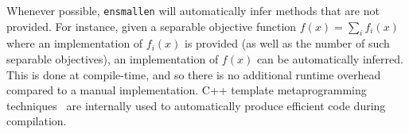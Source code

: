 \documentclass[twoside,11pt]{article}
\begin{document}
Whenever possible, {\tt ensmallen} will automatically infer methods that are
not provided.  For instance, given a separable objective function $f(x) = \sum_i
f_i(x)$ where an implementation of $f_i(x)$ is provided (as well as the number
of such separable objectives), an implementation of $f(x)$ can be automatically
inferred.  This is done at compile-time, and so there is no additional runtime
overhead compared to a manual implementation.  C++ template metaprogramming
techniques~\citep{Abrahams_2004,alexandrescu2001modern} are
internally used to automatically produce efficient code during compilation.



% 
% 
% 
% 
% 
\end{document}
